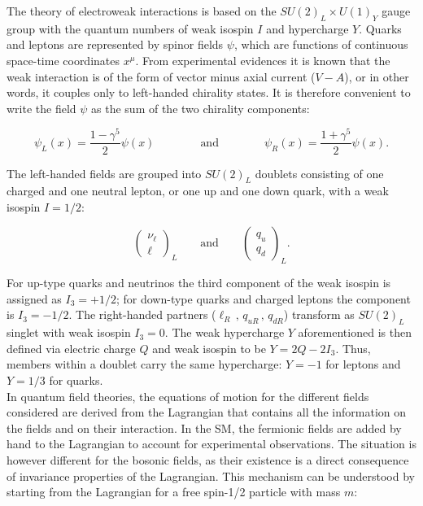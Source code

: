 The theory of electroweak interactions is based on the $SU(2)_L \times U(1)_Y$ gauge group with the quantum numbers of weak isospin $I$ and hypercharge $Y$.
Quarks and leptons are represented by spinor fields $\psi$, which are functions of continuous space-time coordinates $x^\mu$.
From experimental evidences it is known that the weak interaction is of the form of vector minus axial current ($V - A$), or in other words, it couples only to left-handed chirality states.
It is therefore convenient to write the field $\psi$ as the sum of the two chirality components:

\begin{equation}\label{eqn:SM_e1}
\psi_L(x) = \frac{1-\gamma^5}{2}\psi(x) \qquad\qquad \mbox{and} \qquad\qquad  \psi_R(x) = \frac{1+\gamma^5}{2}\psi(x).
\end{equation}

The left-handed fields are grouped into $SU(2)_L$ doublets consisting of one charged and one neutral lepton, or one up and one down quark,
with a weak isospin $I = 1/2$:

\[
\begin{pmatrix}
  \nu_\ell \\ \ell
\end{pmatrix}_L
\qquad
\mbox{and}
\qquad
\begin{pmatrix}
  q_u \\ q_d 
\end{pmatrix}_L.
\]

For up-type quarks and neutrinos the third component of the weak isospin is assigned as $I_3 = +1/2$; for down-type quarks and charged leptons the component is $I_3 = -1/2$.
The right-handed partners ($\ell_R\, ,\, q_{uR}\, ,\, q_{dR}$) transform as $SU(2)_L$ singlet with weak isospin $I_3 = 0$.
The weak hypercharge $Y$ aforementioned is then defined via electric charge $Q$ and weak isospin to be $Y = 2Q - 2I_3$.
Thus, members within a doublet carry the same hypercharge: $Y = -1$ for leptons and $Y = 1/3$ for quarks.\\

In quantum field theories, the equations of motion for the different fields considered are derived from the Lagrangian that contains all the information on the fields and on their interaction.
In the SM, the fermionic fields are added by hand to the Lagrangian to account for experimental observations.
The situation is however different for the bosonic fields, as their existence is a direct consequence of invariance properties of the Lagrangian.
This mechanism can be understood by starting from the Lagrangian for a free spin-1/2 particle with mass $m$:

